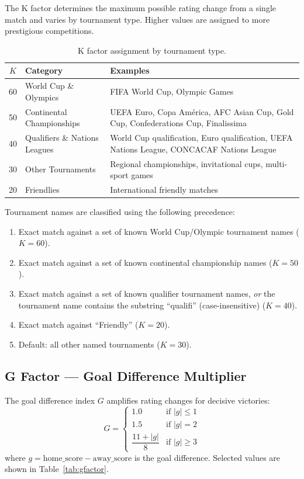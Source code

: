 \documentclass[11pt]{article}
\begin{document}
The K factor determines the maximum possible rating change from a single match and varies by tournament type. Higher values are assigned to more prestigious competitions.

\begin{table}[h]
\centering
\begin{tabular}{@{}clp{7cm}@{}}
\toprule
$K$ & Category & Examples \\
\midrule
60 & World Cup \& Olympics & FIFA World Cup, Olympic Games \\
50 & Continental Championships & UEFA Euro, Copa Am\'erica, AFC Asian Cup, Gold Cup, Confederations Cup, Finalissima \\
40 & Qualifiers \& Nations Leagues & World Cup qualification, Euro qualification, UEFA Nations League, CONCACAF Nations League \\
30 & Other Tournaments & Regional championships, invitational cups, multi-sport games \\
20 & Friendlies & International friendly matches \\
\bottomrule
\end{tabular}
\caption{K factor assignment by tournament type.}
\label{tab:kfactor}
\end{table}

Tournament names are classified using the following precedence:
\begin{enumerate}[nosep]
    \item Exact match against a set of known World Cup/Olympic tournament names ($K=60$).
    \item Exact match against a set of known continental championship names ($K=50$).
    \item Exact match against a set of known qualifier tournament names, \textit{or} the tournament name contains the substring ``qualifi'' (case-insensitive) ($K=40$).
    \item Exact match against ``Friendly'' ($K=20$).
    \item Default: all other named tournaments ($K=30$).
\end{enumerate}

\subsection{G Factor --- Goal Difference Multiplier}
\label{sec:gfactor}

The goal difference index $G$ amplifies rating changes for decisive victories:
\begin{equation}
G = \begin{cases}
1.0 & \text{if } |g| \leq 1 \\
1.5 & \text{if } |g| = 2 \\
\dfrac{11 + |g|}{8} & \text{if } |g| \geq 3
\end{cases}
\label{eq:gfactor}
\end{equation}
where $g = \text{home\_score} - \text{away\_score}$ is the goal difference. Selected values are shown in Table~\ref{tab:gfactor}.
\end{document}

